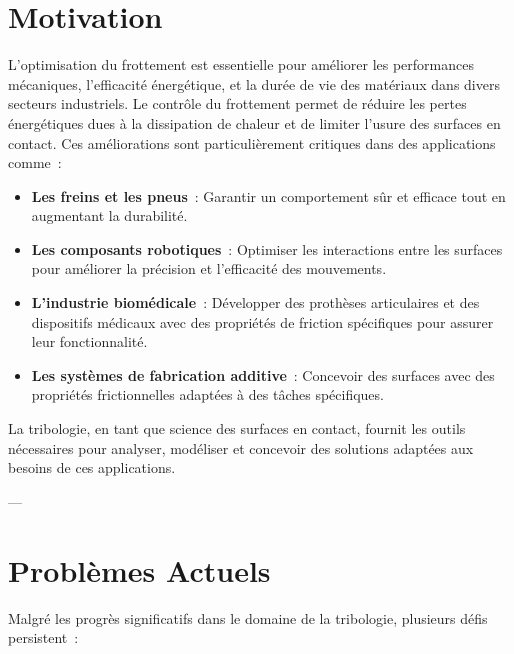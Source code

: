 \section*{Motivation}

L’optimisation du frottement est essentielle pour améliorer les performances mécaniques, l’efficacité énergétique, et la durée de vie des matériaux dans divers secteurs industriels. Le contrôle du frottement permet de réduire les pertes énergétiques dues à la dissipation de chaleur et de limiter l’usure des surfaces en contact. Ces améliorations sont particulièrement critiques dans des applications comme :
\begin{itemize}
    \item \textbf{Les freins et les pneus} : Garantir un comportement sûr et efficace tout en augmentant la durabilité.
    \item \textbf{Les composants robotiques} : Optimiser les interactions entre les surfaces pour améliorer la précision et l'efficacité des mouvements.
    \item \textbf{L’industrie biomédicale} : Développer des prothèses articulaires et des dispositifs médicaux avec des propriétés de friction spécifiques pour assurer leur fonctionnalité.
    \item \textbf{Les systèmes de fabrication additive} : Concevoir des surfaces avec des propriétés frictionnelles adaptées à des tâches spécifiques.
\end{itemize}

La tribologie, en tant que science des surfaces en contact, fournit les outils nécessaires pour analyser, modéliser et concevoir des solutions adaptées aux besoins de ces applications.

---

\section*{Problèmes Actuels}

Malgré les progrès significatifs dans le domaine de la tribologie, plusieurs défis persistent :

